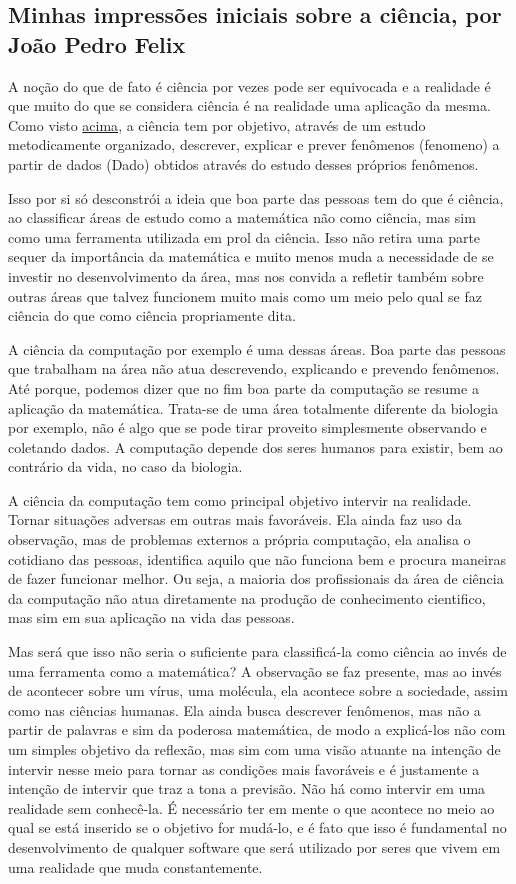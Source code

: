 \subsection{Minhas impressões iniciais sobre a ciência, por João Pedro Felix}

A noção do que de fato é ciência por vezes pode ser equivocada e a realidade é que muito do que se considera ciência é na realidade uma aplicação da mesma.
Como visto \hyperlink{1-Introducao/aulas/Ciencia-e-sua-Avaliacao.pdf.2}{acima}, a ciência tem por objetivo, através de um estudo metodicamente organizado, descrever, explicar e prever fenômenos (\gls{fenomeno}) a partir de dados (\gls{Dado}) obtidos através do estudo desses próprios fenômenos.

Isso por si só desconstrói a ideia que boa parte das pessoas tem do que é ciência, ao classificar áreas de estudo como a matemática não como ciência, mas sim como uma ferramenta utilizada em prol da ciência. Isso não retira uma parte sequer da importância da matemática e muito menos muda a necessidade de se investir no desenvolvimento da área, mas nos convida a refletir também sobre outras áreas que talvez funcionem muito mais como um meio pelo qual se faz ciência do que como ciência propriamente dita.

A ciência da computação por exemplo é uma dessas áreas. Boa parte das pessoas que trabalham na área não atua descrevendo, explicando e prevendo fenômenos. Até porque, podemos dizer que no fim boa parte da computação se resume a aplicação da matemática. Trata-se de uma área totalmente diferente da biologia por exemplo, não é algo que se pode tirar proveito simplesmente observando e coletando dados. A computação depende dos seres humanos para existir, bem ao contrário da vida, no caso da biologia.

A ciência da computação tem como principal objetivo intervir na realidade. Tornar situações adversas em outras mais favoráveis. Ela ainda faz uso da observação, mas de problemas externos a própria computação, ela analisa o cotidiano das pessoas, identifica aquilo que não funciona bem e procura maneiras de fazer funcionar melhor. Ou seja, a maioria dos profissionais da área de ciência da computação não atua diretamente na produção de conhecimento cientifico, mas sim em sua aplicação na vida das pessoas.

Mas será que isso não seria o suficiente para classificá-la como ciência ao invés de uma ferramenta como a matemática? A observação se faz presente, mas ao invés de acontecer sobre um vírus, uma molécula, ela acontece sobre a sociedade, assim como nas ciências humanas. Ela ainda busca descrever fenômenos, mas não a partir de palavras e sim da poderosa matemática, de modo a explicá-los não com um simples objetivo da reflexão, mas sim com uma visão atuante na intenção de intervir nesse meio para tornar as condições mais favoráveis e é justamente a intenção de intervir que traz a tona a previsão. Não há como intervir em uma realidade sem conhecê-la. É necessário ter em mente o que acontece no meio ao qual se está inserido se o objetivo for mudá-lo, e é fato que isso é fundamental no desenvolvimento de qualquer software que será utilizado por seres que vivem em uma realidade que muda constantemente.


